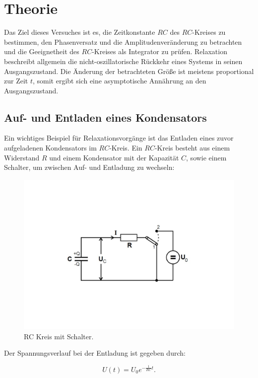 \section{Theorie}
\label{sec:Theorie}

Das Ziel dieses Versuches ist es, die Zeitkonstante $RC$ des $RC$-Kreises zu bestimmen, den Phasenversatz und die Amplitudenveränderung
zu betrachten und die Geeignetheit des $RC$-Kreises als Integrator zu prüfen.  
Relaxation beschreibt allgemein die nicht-oszillatorische Rückkehr eines Systems in seinen Ausgangszustand.
Die Änderung der betrachteten Größe ist meistens proportional zur Zeit $t$, somit ergibt sich eine asymptotische
Annährung an den Ausgangszustand.\cite{v353}

\subsection{Auf- und Entladen eines Kondensators}
Ein wichtiges Beispiel für Relaxationsvorgänge ist das Entladen eines zuvor aufgeladenen Kondensators im $RC$-Kreis.
Ein $RC$-Kreis besteht aus einem Widerstand $R$ und einem Kondensator mit der Kapazität $C$, sowie einem Schalter, um zwischen 
Auf- und Entladung zu wechseln:
\begin{figure}
    \centering
    \includegraphics[height=8cm]{content/Theorie - RC-Kreis.pdf}
    \caption{RC Kreis mit Schalter. \cite{v353}}
    \label{fig:Theorie - RC_Kreis}
\end{figure}

Der Spannungsverlauf bei der Entladung ist gegeben durch:

\begin{equation}
    U(t)= U_{0}e^{-\frac{1}{RC}t}.  \label{eqn:Entladen}
\end{equation}

